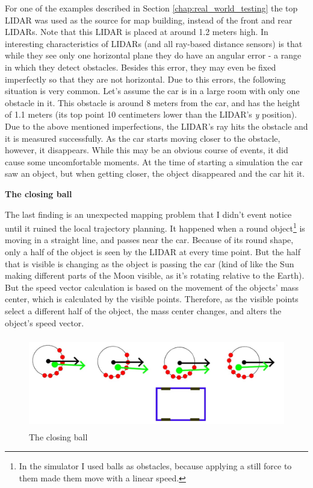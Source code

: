 For one of the examples described in Section \ref{chap:real_world_testing} the top LIDAR was used as the source for map building, instead of the front and rear LIDARs. Note that this LIDAR is placed at around 1.2 meters high. In interesting characteristics of LIDARs (and all ray-based distance sensors) is that while they see only one horizontal plane they do have an angular error - a range in which they detect obstacles. Besides this error, they may even be fixed imperfectly so that they are not horizontal. Due to this errors, the following situation is very common. Let's assume the car is in a large room with only one obstacle in it. This obstacle is around 8 meters from the car, and has the height of 1.1 meters (its top point 10 centimeters lower than the LIDAR's \textit{y} position). Due to the above mentioned imperfections, the LIDAR's ray hits the obstacle and it is measured successfully. As the car starts moving closer to the obstacle, however, it disappears. While this may be an obvious course of events, it did cause some uncomfortable moments. At the time of starting a simulation the car saw an object, but when getting closer, the object disappeared and the car hit it.

\textbf{The closing ball}

The last finding is an unexpected mapping problem that I didn't event notice until it ruined the local trajectory planning. It happened when a round object\footnote{In the simulator I used balls as obstacles, because applying a still force to them made them move with a linear speed.} is moving in a straight line, and passes near the car. Because of its round shape, only a half of the object is seen by the LIDAR at every time point. But the half that is visible is changing as the object is passing the car (kind of like the Sun making different parts of the Moon visible, as it's rotating relative to the Earth). But the speed vector calculation is based on the movement of the objects' mass center, which is calculated by the visible points. Therefore, as the visible points select a different half of the object, the mass center changes, and alters the object's speed vector.

\begin{figure}[!ht]
    \centering
    \includegraphics[height=40mm]{figures/raw/jpeg/closing_ball.jpg}
    \caption{The closing ball}
    \label{closing_ball}
\end{figure} 

